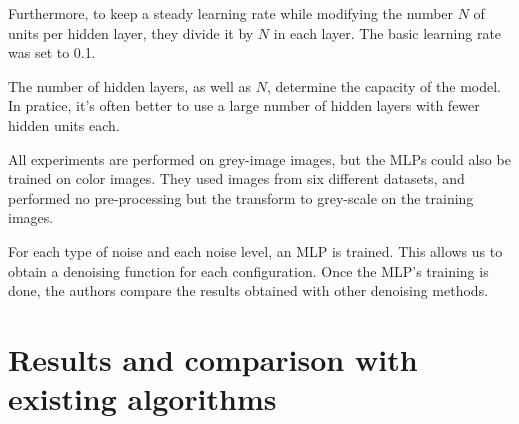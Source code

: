 \documentclass[10pt,a4paper]{article}
\newcommand{\svs}{\vspace{9pt}}
\begin{document}
\svs

Furthermore, to keep a steady learning rate while modifying the number $N$ of units per hidden layer, they divide it by $N$ in each layer. The basic learning rate was set to 0.1. 

\svs

The number of hidden layers, as well as $N$, determine the capacity of the model. In pratice, it's often better to use a large number of hidden layers with fewer hidden units each.

\svs

All experiments are performed on grey-image images, but the MLPs could also be trained on color images. They used images from six different datasets, and performed no pre-processing but the transform to grey-scale on the training images. 

\svs 

For each type of noise and each noise level, an MLP is trained. This allows us to obtain a
denoising function for each configuration.
Once the MLP's training is done, the authors compare the results obtained with other denoising methods.




\svs

\section{Results and comparison with existing algorithms}

\end{document}
